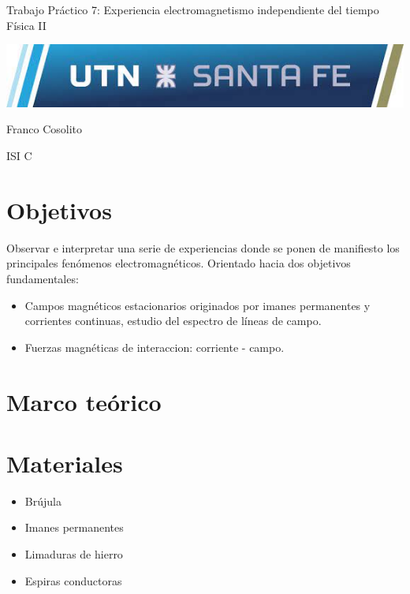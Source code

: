 \documentclass[11pt, letterpaper]{article}
\newcommand\vspt{15pt}
\newcommand\tpn{7}
\newcommand\tptitle{Experiencia electromagnetismo independiente del tiempo}
\newcommand\tpsubj{Física II}
\begin{document}
\thispagestyle{empty}

\begin{center}\Huge{Trabajo Práctico \tpn: \tptitle\\
\vspace{\vspt}
\tpsubj}\end{center}

\vspace{\vspt}
\includegraphics[width=\linewidth]{utnlogo}

\vspace{\vspt}
\begin{center}\Huge{Franco Cosolito}\end{center}

\vspace{\vspt}
\begin{center}\Large{ISI C}\end{center}
\pagebreak

\setcounter{page}{1}
\section{Objetivos}
Observar e interpretar una serie de experiencias donde se ponen de 
manifiesto los principales fenómenos electromagnéticos. Orientado
hacia dos objetivos fundamentales: 
\begin{itemize}
    \item Campos magnéticos estacionarios originados por imanes
        permanentes y corrientes continuas, estudio del espectro
        de líneas de campo.
    \item Fuerzas magnéticas de interaccion: corriente - campo.
\end{itemize}

\section{Marco teórico}

\section{Materiales}
\begin{itemize}
    \item Brújula
    \item Imanes permanentes
    \item Limaduras de hierro
    \item Espiras conductoras
\end{itemize}
\end{document}
